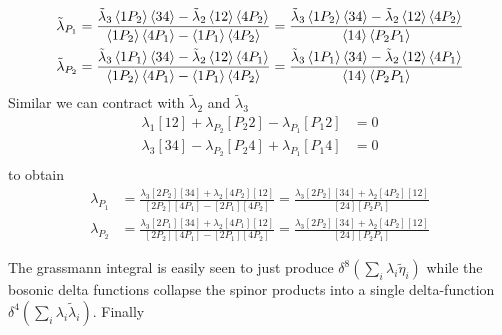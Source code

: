 \documentclass[a4paper,12pt]{article}
\begin{document}
\begin{equation}
	\begin{aligned}
		\tilde \lambda_{P_1}&=\frac{\tilde{\lambda}_3
		\expval{1P_2}\expval{34}
		-
		\tilde{\lambda}_2
		\expval{12}\expval{4P_2}
	}{\expval{1P_2}\expval{4P_1}
	-
	\expval{1P_1}\expval{4P_2}}
=\frac{\tilde{\lambda}_3
	\expval{1P_2}\expval{34}
	-
	\tilde{\lambda}_2
	\expval{12}\expval{4P_2}
}{\expval{14}\expval{P_2P_1}}
\\
		\tilde \lambda_{P_2}&=\frac{\tilde{\lambda}_3
	\expval{1P_1}\expval{34}
	-
	\tilde{\lambda}_2
	\expval{12}\expval{4P_1}
}{\expval{1P_2}\expval{4P_1}
	-
	\expval{1P_1}\expval{4P_2}}=\frac{\tilde{\lambda}_3
	\expval{1P_1}\expval{34}
	-
	\tilde{\lambda}_2
	\expval{12}\expval{4P_1}
}{\expval{14}\expval{P_2P_1}}\\
	\end{aligned}
\end{equation}
Similar we can contract with $ \tilde \lambda_2$ and $\tilde \lambda_3$
\begin{equation}
	\begin{aligned}
		\lambda_1[12]+\lambda_{P_2}[P_2 2]-\lambda_{P_1}[P_1 2]&=0\\
		\lambda_3[34]-\lambda_{P_2}[P_2 4]+\lambda_{P_1}[P_1 4]&=0\\
	\end{aligned}
\end{equation}
to obtain
\begin{equation}
	\begin{aligned}
		\lambda_{P_1}&=\frac{\lambda_3[2P_2][34]+\lambda_2[4P_2][12]}{[2P_2][4P_1]-[2P_1][4P_2]}=\frac{\lambda_3[2P_2][34]+\lambda_2[4P_2][12]}{[24][P_2P_1]}\\
		\lambda_{P_2}&=\frac{\lambda_3[2P_1][34]+\lambda_2[4P_1][12]}{[2P_2][4P_1]-[2P_1][4P_2]}=\frac{\lambda_3[2P_2][34]+\lambda_2[4P_2][12]}{[24][P_2P_1]}
	\end{aligned}
\end{equation}

The grassmann integral is easily seen to just produce $\delta^8(\sum_i\lambda_i\tilde \eta_i)$ while the bosonic delta functions collapse the spinor products into a single delta-function $\delta^4(\sum_i\lambda_i\tilde \lambda_i)$. Finally 
\end{document}
